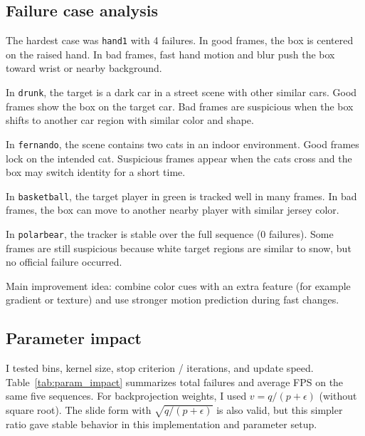 \documentclass[9pt]{IEEEtran}
\begin{document}
\subsection{Failure case analysis}
The hardest case was \texttt{hand1} with 4 failures.
In good frames, the box is centered on the raised hand.
In bad frames, fast hand motion and blur push the box toward wrist or nearby background.

In \texttt{drunk}, the target is a dark car in a street scene with other similar cars.
Good frames show the box on the target car.
Bad frames are suspicious when the box shifts to another car region with similar color and shape.

In \texttt{fernando}, the scene contains two cats in an indoor environment.
Good frames lock on the intended cat.
Suspicious frames appear when the cats cross and the box may switch identity for a short time.

In \texttt{basketball}, the target player in green is tracked well in many frames.
In bad frames, the box can move to another nearby player with similar jersey color.

In \texttt{polarbear}, the tracker is stable over the full sequence (0 failures).
Some frames are still suspicious because white target regions are similar to snow, but no official failure occurred.

Main improvement idea: combine color cues with an extra feature (for example gradient or texture) and use stronger motion prediction during fast changes.

\subsection{Parameter impact}
I tested bins, kernel size, stop criterion / iterations, and update speed.
Table~\ref{tab:param_impact} summarizes total failures and average FPS on the same five sequences.
For backprojection weights, I used \(v = q / (p + \epsilon)\) (without square root). The slide form with \(\sqrt{q/(p+\epsilon)}\) is also valid, but this simpler ratio gave stable behavior in this implementation and parameter setup.
\end{document}
